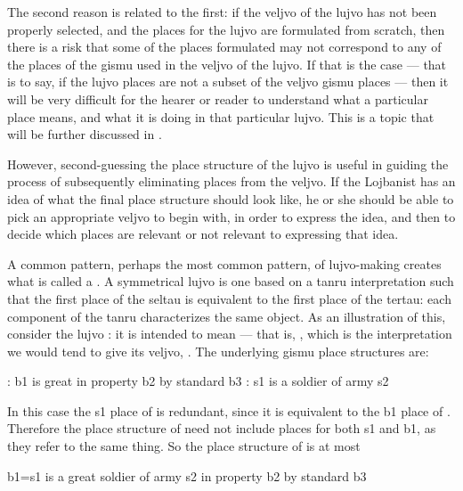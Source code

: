 The second reason is related to the first: if the veljvo of
    the lujvo has not been properly selected, and the places for
    the lujvo are formulated from scratch, then there is a risk
    that some of the places formulated may not correspond to any of
    the places of the gismu used in the veljvo of the lujvo. If
    that is the case --- that is to say, if the lujvo places are
    not a subset of the veljvo gismu places --- then it will be
    very difficult for the hearer or reader to understand what a
    particular place means, and what it is doing in that particular
    lujvo. This is a topic that will be further discussed in .

However, second-guessing the place structure of the lujvo is
    useful in guiding the process of subsequently eliminating
    places from the veljvo. If the Lojbanist has an idea of what
    the final place structure should look like, he or she should be
    able to pick an appropriate veljvo to begin with, in order to
    express the idea, and then to decide which places are relevant
    or not relevant to expressing that idea.



A common pattern, perhaps the most common pattern, of
    lujvo-making creates what is called a . A
    symmetrical lujvo is one based on a tanru interpretation such
    that the first place of the seltau is equivalent to the first
    place of the tertau: each component of the tanru characterizes
    the same object. As an illustration of this, consider the lujvo
    : it is intended to mean 
    --- that is, , which is the interpretation we
    would tend to give its veljvo, . The underlying
    gismu place structures are:
\begin{example}
: b1 is great in property b2 by standard b3\n
{}: s1 is a soldier of army s2
\end{example}

In this case the s1 place of  is redundant, since
    it is equivalent to the b1 place of . Therefore the
    place structure of  need not include places for both
    s1 and b1, as they refer to the same thing. So the place
    structure of  is at most
\begin{example}
b1=s1 is a great soldier of army s2\n
\T	in property b2 by standard b3
\end{example}

